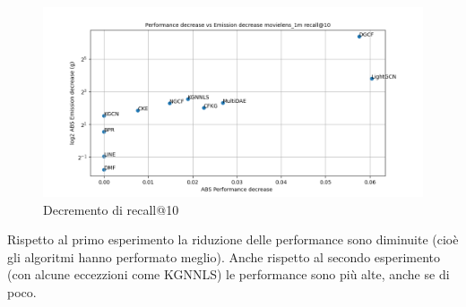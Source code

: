 \begin{figure}[H]
    \centering
     \includegraphics[width=\textwidth]{images/decrement_recall@10_movielens_1m_40_6.png}
    \caption{Decremento di recall@10}
\end{figure}

\noindent Rispetto al primo esperimento la riduzione delle performance sono diminuite (cioè gli algoritmi hanno performato meglio). Anche rispetto al secondo esperimento (con alcune eccezzioni come KGNNLS) le performance sono più alte, anche se di poco.

